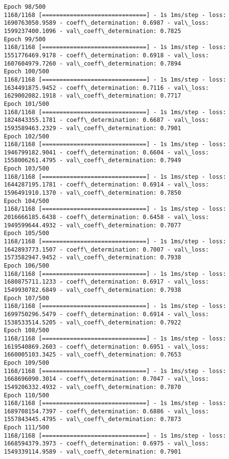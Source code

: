 \documentclass[11pt]{article}
\begin{document}
\begin{Verbatim}[commandchars=\\\{\}]
Epoch 98/500
1168/1168 [==============================] - 1s 1ms/step - loss: 1690763050.9589 - coeff\_determination: 0.6987 - val\_loss: 1599237400.1096 - val\_coeff\_determination: 0.7825
Epoch 99/500
1168/1168 [==============================] - 1s 1ms/step - loss: 1551776469.9178 - coeff\_determination: 0.6918 - val\_loss: 1607604979.7260 - val\_coeff\_determination: 0.7894
Epoch 100/500
1168/1168 [==============================] - 1s 1ms/step - loss: 1634491875.9452 - coeff\_determination: 0.7116 - val\_loss: 1629002082.1918 - val\_coeff\_determination: 0.7717
Epoch 101/500
1168/1168 [==============================] - 1s 1ms/step - loss: 1824843355.1781 - coeff\_determination: 0.6687 - val\_loss: 1593589463.2329 - val\_coeff\_determination: 0.7901
Epoch 102/500
1168/1168 [==============================] - 1s 1ms/step - loss: 1946799182.9041 - coeff\_determination: 0.6604 - val\_loss: 1558006261.4795 - val\_coeff\_determination: 0.7949
Epoch 103/500
1168/1168 [==============================] - 1s 1ms/step - loss: 1644287195.1781 - coeff\_determination: 0.6914 - val\_loss: 1596491910.1370 - val\_coeff\_determination: 0.7850
Epoch 104/500
1168/1168 [==============================] - 1s 1ms/step - loss: 2016666185.6438 - coeff\_determination: 0.6458 - val\_loss: 1949599644.4932 - val\_coeff\_determination: 0.7077
Epoch 105/500
1168/1168 [==============================] - 1s 1ms/step - loss: 1642893773.1507 - coeff\_determination: 0.7007 - val\_loss: 1573582947.9452 - val\_coeff\_determination: 0.7938
Epoch 106/500
1168/1168 [==============================] - 1s 1ms/step - loss: 1680875711.1233 - coeff\_determination: 0.6917 - val\_loss: 1549930782.6849 - val\_coeff\_determination: 0.7938
Epoch 107/500
1168/1168 [==============================] - 1s 1ms/step - loss: 1699750296.5479 - coeff\_determination: 0.6914 - val\_loss: 1538533514.5205 - val\_coeff\_determination: 0.7922
Epoch 108/500
1168/1168 [==============================] - 1s 1ms/step - loss: 1619540869.2603 - coeff\_determination: 0.6951 - val\_loss: 1660005103.3425 - val\_coeff\_determination: 0.7653
Epoch 109/500
1168/1168 [==============================] - 1s 1ms/step - loss: 1668696090.3014 - coeff\_determination: 0.7047 - val\_loss: 1549206332.4932 - val\_coeff\_determination: 0.7870
Epoch 110/500
1168/1168 [==============================] - 1s 1ms/step - loss: 1689708154.7397 - coeff\_determination: 0.6886 - val\_loss: 1557843445.4795 - val\_coeff\_determination: 0.7873
Epoch 111/500
1168/1168 [==============================] - 1s 1ms/step - loss: 1668594379.3973 - coeff\_determination: 0.6975 - val\_loss: 1549339114.9589 - val\_coeff\_determination: 0.7901

\end{Verbatim}
\end{document}
